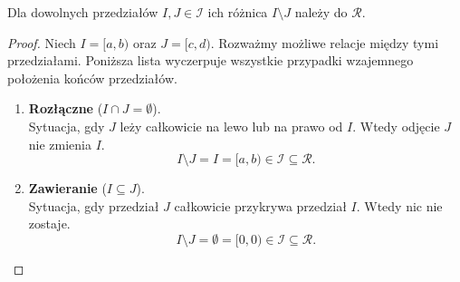 \begin{lemma}
	Dla dowolnych przedziałów $I,J \in \mathcal{I}$ ich różnica $I\setminus J$ należy do $\mathcal{R}$.
\end{lemma} 
\begin{proof}
	Niech $I = [a, b)$ oraz $J = [c, d)$. Rozważmy możliwe relacje między tymi przedziałami. Poniższa lista wyczerpuje wszystkie przypadki wzajemnego położenia końców przedziałów.

    \begin{enumerate}[label=\textbf{\arabic*.}]
        
        \item \textbf{Rozłączne} ($I \cap J = \emptyset$).\\
        Sytuacja, gdy $J$ leży całkowicie na lewo lub na prawo od $I$. Wtedy odjęcie $J$ nie zmienia $I$.
        \[
            I \setminus J = I = [a, b) \in \mathcal{I} \subseteq \mathcal{R}.
        \]
        
        \begin{center}
        \end{center}

        \item \textbf{Zawieranie} ($I \subseteq J$).\\
        Sytuacja, gdy przedział $J$ całkowicie przykrywa przedział $I$. Wtedy nic nie zostaje.
        \[
            I \setminus J = \emptyset = [0, 0) \in \mathcal{I} \subseteq \mathcal{R}.
        \]


\end{enumerate}
\end{proof}
